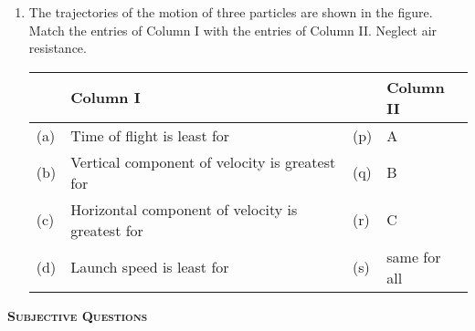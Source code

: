\documentclass{article}
\begin{document}
\begin{enumerate}
    \item The trajectories of the motion of three particles are shown in the figure. Match the entries of Column I with the entries of Column II. Neglect air resistance.
    \begin{center}
    \end{center}
    \begin{center}
        \renewcommand{\arraystretch}{2}
        \begin{table}[h]
            \centering
            \begin{tabular}{p{0.25cm}p{8cm}|p{0.25cm}p{5cm}}
            \hline
            & Column I & & Column II \\
            \hline
            (a) & Time of flight is least for & (p) & A \\
            (b) & Vertical component of velocity is greatest for & (q) & B \\
            (c) & Horizontal component of velocity is greatest for & (r) & C \\
            (d) & Launch speed is least for & (s) & same for all \\
            \hline
            \end{tabular}
        \end{table}
    \end{center}
\end{enumerate}

\pagebreak

\begin{center}
    \textsc{\textbf{Subjective Questions}}
\end{center}
\end{document}
